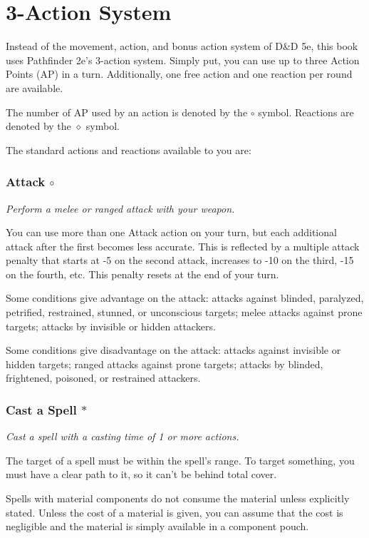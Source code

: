 \section{3-Action System} \label{sec::3actionsystem}
Instead of the movement, action, and bonus action system of D\&D 5e, this book uses Pathfinder 2e's 3-action system.
Simply put, you can use up to three Action Points (AP) in a turn.
Additionally, one free action and one reaction per round are available.

The number of AP used by an action is denoted by the $\circ$ symbol.
Reactions are denoted by the $\diamond$ symbol. %

The standard actions and reactions available to you are:

\subsubsection{Attack $\circ$} \label{act::attack}
    \textit{Perform a melee or ranged attack with your weapon.}

    You can use more than one Attack action on your turn, but each additional attack after the first becomes less accurate.
    This is reflected by a multiple attack penalty that starts at -5 on the second attack, increases to -10 on the third, -15 on the fourth, etc.
    This penalty resets at the end of your turn.

    Some conditions give advantage on the attack: attacks against blinded, paralyzed, petrified, restrained, stunned, or unconscious targets; melee attacks against prone targets; attacks by invisible or hidden attackers.

    Some conditions give disadvantage on the attack: attacks against invisible or hidden targets; ranged attacks against prone targets; attacks by blinded, frightened, poisoned, or restrained attackers.
\subsubsection{Cast a Spell $\ast$} \label{act::castaspell}
    \textit{Cast a spell with a casting time of 1 or more actions.}

    The target of a spell must be within the spell's range.
    To target something, you must have a clear path to it, so it can't be behind total cover.

    Spells with material components do not consume the material unless explicitly stated.
    Unless the cost of a material is given, you can assume that the cost is negligible and the material is simply available in a component pouch.

